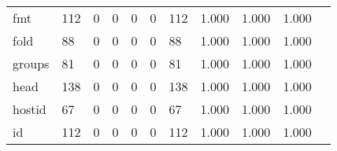 \begin{longtable}{lp{1.2cm}p{1.2cm}p{1.2cm}p{1.2cm}p{1.2cm}p{1.2cm}p{1.2cm}p{1.2cm}p{1.2cm}p{1.2cm}}
fmt       &                                   112 &                                                  0 &                                                  0 &                                                  0 &                                                  0 &                                                112 &                                         1.000 &                                              1.000 &                                              1.000 \\
fold      &                                    88 &                                                  0 &                                                  0 &                                                  0 &                                                  0 &                                                 88 &                                         1.000 &                                              1.000 &                                              1.000 \\
groups    &                                    81 &                                                  0 &                                                  0 &                                                  0 &                                                  0 &                                                 81 &                                         1.000 &                                              1.000 &                                              1.000 \\
head      &                                   138 &                                                  0 &                                                  0 &                                                  0 &                                                  0 &                                                138 &                                         1.000 &                                              1.000 &                                              1.000 \\
hostid    &                                    67 &                                                  0 &                                                  0 &                                                  0 &                                                  0 &                                                 67 &                                         1.000 &                                              1.000 &                                              1.000 \\
id        &                                   112 &                                                  0 &                                                  0 &                                                  0 &                                                  0 &                                                112 &                                         1.000 &                                              1.000 &                                              1.000 \\

\end{longtable}
